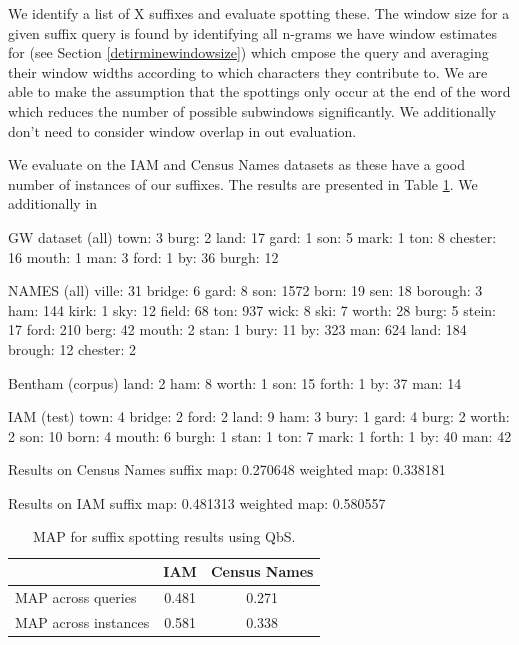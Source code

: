 \documentclass[ms,electronic,twosidetoc,letterpaper,chaptercenter,parttop,lol,lof,lot]{byumsphd}
\begin{document}
We identify a list of X suffixes and evaluate spotting these. 
 The window size for a given suffix query is found by identifying all n-grams we have window estimates for (see Section \ref{detirminewindowsize}) which cmpose the query and averaging their window widths according to which characters they contribute to.
We are able to make the assumption that the spottings only occur at the end of the word which reduces the number of possible subwindows significantly. We additionally don't need to consider window overlap in out evaluation.

We evaluate on the IAM and Census Names datasets as these have a good number of instances of our suffixes. The results are presented in Table \ref{tab:suffixspottingresults}. We additionally in

GW dataset (all)
town: 3
burg: 2
land: 17
gard: 1
son: 5
mark: 1
ton: 8
chester: 16
mouth: 1
man: 3
ford: 1
by: 36
burgh: 12

NAMES (all)
ville: 31
bridge: 6
gard: 8
son: 1572
born: 19
sen: 18
borough: 3
ham: 144
kirk: 1
sky: 12
field: 68
ton: 937
wick: 8
ski: 7
worth: 28
burg: 5
stein: 17
ford: 210
berg: 42
mouth: 2
stan: 1
bury: 11
by: 323
man: 624
land: 184
brough: 12
chester: 2

Bentham (corpus)
land: 2
ham: 8
worth: 1
son: 15
forth: 1
by: 37
man: 14

IAM (test)
town: 4
bridge: 2
ford: 2
land: 9
ham: 3
bury: 1
gard: 4
burg: 2
worth: 2
son: 10
born: 4
mouth: 6
burgh: 1
stan: 1
ton: 7
mark: 1
forth: 1
by: 40
man: 42

Results on Census Names
  suffix map: 0.270648
weighted map: 0.338181

Results on IAM
  suffix map: 0.481313 
weighted map: 0.580557


\begin{table}
\centering
\begin{tabular}{| l | c  c |}
  \hline
   & IAM & Census Names\\
  \hline			
  MAP across queries & 0.481  & 0.271\\
  MAP across instances & 0.581 & 0.338\\ 
  \hline  
\end{tabular}
\caption{MAP for suffix spotting results using QbS.}
\label{tab:suffixspottingresults}
\end{table}
\end{document}
